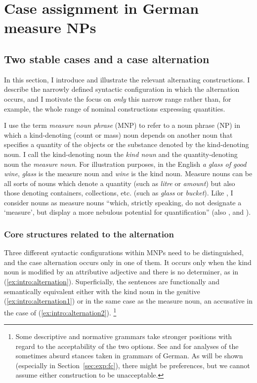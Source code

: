 \section{Case assignment in German measure NPs}
\label{sec:germanmeasurenps}

\subsection{Two stable cases and a case alternation}
\label{sec:descriptive}

In this section, I introduce and illustrate the relevant alternating constructions.
I describe the narrowly defined syntactic configuration in which the alternation occurs, and I motivate the focus on \textit{only} this narrow range rather than, for example, the whole range of nominal constructions expressing quantities.

I use the term \textit{measure noun phrase} (MNP) to refer to a noun phrase (NP) in which a kind-denoting (count or mass) noun depends on another noun that specifies a quantity of the objects or the substance denoted by the kind-denoting noun.
I call the kind-denoting noun the \textit{kind noun} and the quantity-denoting noun the \textit{measure noun}.
For illustration purposes, in the English \textit{a glass of good wine}, \textit{glass} is the measure noun and \textit{wine} is the kind noun.
Measure nouns can be all sorts of nouns which denote a quantity (such as \textit{litre} or \textit{amount}) but also those denoting containers, collections, etc. (such as \textit{glass} or \textit{bucket}).
Like \citet[284]{Brems2003}, I consider nouns as measure nouns ``which, strictly speaking, do not designate a `measure', but display a more nebulous potential for quantification'' (also \citealp[530]{Koptjevskaja2001}, and \citealp[338]{Rutkowski2007}).

\subsubsection{Core structures related to the alternation}

Three different syntactic configurations within MNPs need to be distinguished, and the case alternation occurs only in one of them.
It occurs only when the kind noun is modified by an attributive adjective and there is no determiner, as in (\ref{ex:intro:alternation}).
Superficially, the sentences are functionally and semantically equivalent either with the kind noun in the genitive (\ref{ex:intro:alternation1}) or in the same case as the measure noun, an accusative in the case of (\ref{ex:intro:alternation2}).%
\footnote{Some descriptive and normative grammars take stronger positions with regard to the acceptability of the two options.
See \cite{Hentschel1993} and \cite{Zimmer2015} for analyses of the sometimes absurd stances taken in grammars of German.
As will be shown (especially in Section~\ref{sec:exp:fc}), there might be preferences, but we cannot assume either construction to be unacceptable.
}

